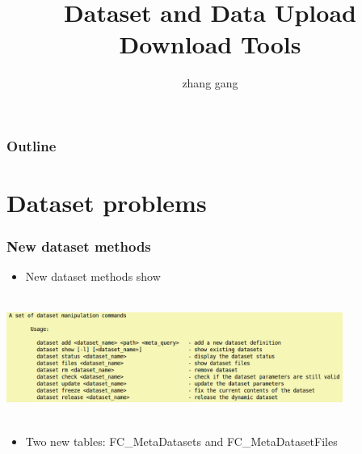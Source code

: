 \documentclass{beamer}
\begin{document}
\title{Dataset and Data Upload Download Tools}
\author{zhang gang}

\maketitle

\begin{frame}
      \frametitle{Outline}
      \tableofcontents
\end{frame}

\section{Dataset problems}
\begin{frame}
  \frametitle{New dataset methods}
  \begin{itemize}
    \item New dataset methods show
  \end{itemize}
  \hspace{0.5cm} 
  \includegraphics[height=4cm,width=11cm,keepaspectratio]{data/datasetMethod.png}
  \begin{itemize}
    \item Two new tables: FC\_MetaDatasets and FC\_MetaDatasetFiles
  \end{itemize}
\end{frame}
\end{document}
